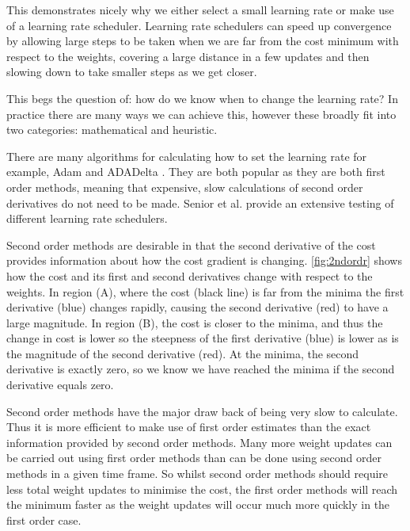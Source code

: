 This demonstrates nicely why we either select a small learning rate or make use of a learning rate scheduler.
Learning rate schedulers can speed up convergence by allowing large steps to be taken when we are far from the cost minimum with respect to the weights, covering a large distance in a few updates and then slowing down to take smaller steps as we get closer. 

This begs the question of: how do we know when to change the learning rate? In  practice there are many ways we can achieve this, however these broadly fit into two categories: mathematical and heuristic.

There are many algorithms for calculating how to set the learning rate for example, Adam \cite{kingma2014adam} and ADADelta \cite{zeiler2012adadelta}. They are both popular as they are both first order methods, meaning that expensive, slow calculations of second order derivatives do not need to be made.
Senior et al.\cite{senior2013empirical} provide an extensive testing of different learning rate schedulers. 

Second order methods are desirable in that the second derivative of the cost provides information about how the cost gradient is changing. \autoref{fig:2ndordr} shows how the cost and its first and second derivatives change with respect to the weights. In region (A), where the cost (black line) is far from the minima the first derivative (blue) changes rapidly, causing the second derivative (red) to have a large magnitude. In region (B), the cost is closer to the minima, and thus the change in cost is lower so the steepness of the first derivative (blue) is lower as is the magnitude of the second derivative (red). At the minima, the second derivative is exactly zero, so we know we have reached the minima if the second derivative equals zero.

Second order methods have the major draw back of being very slow to calculate. Thus it is more efficient to make use of first order estimates than the exact information provided by second order methods. Many more weight updates can be carried out using first order methods than can be done using second order methods in a given time frame. So whilst second order methods should require less total weight updates to minimise the cost, the first order methods will reach the minimum faster as the weight updates will occur much more quickly in the first order case.


